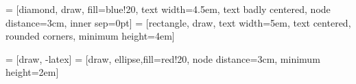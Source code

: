 









%


 = [diamond, draw, fill=blue!20, 
    text width=4.5em, text badly centered, node distance=3cm, inner sep=0pt]
 = [rectangle, draw, 
    text width=5em, text centered, rounded corners, minimum height=4em]

 = [draw, -latex]
 = [draw, ellipse,fill=red!20, node distance=3cm,
    minimum height=2em]
    
